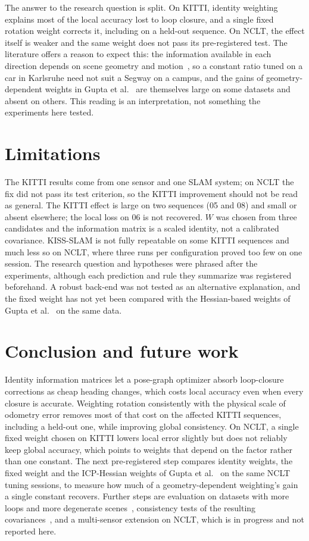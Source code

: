 \documentclass[11pt,a4paper]{article}
\begin{document}
The answer to the research question is split. On KITTI, identity weighting explains most of the local accuracy
lost to loop closure, and a single fixed rotation weight corrects it, including on a held-out sequence. On NCLT,
the effect itself is weaker and the same weight does not pass its pre-registered test. The literature offers a
reason to expect this: the information available in each direction depends on scene geometry and
motion~\cite{degeneracy}, so a constant ratio tuned on a car in Karlsruhe need not suit a Segway on a campus, and
the gains of geometry-dependent weights in Gupta et al.~\cite{retroslam} are themselves large on some datasets
and absent on others. This reading is an interpretation, not something the experiments here tested.

\section{Limitations}
\label{sec:limits}
The KITTI results come from one sensor and one SLAM system; on NCLT the fix did not pass its test criterion, so
the KITTI improvement should not be read as general. The KITTI effect is large on two sequences (05 and 08) and
small or absent elsewhere; the local loss on 06 is not recovered. $W$ was chosen from three candidates and
the information matrix is a scaled identity, not a calibrated covariance. KISS-SLAM is not fully repeatable on
some KITTI sequences and much less so on NCLT, where three runs per configuration proved too few on one session.
The research question and hypotheses were phrased after the experiments, although each prediction and rule they
summarize was registered beforehand. A robust back-end was not tested as an alternative explanation, and the
fixed weight has not yet been compared with the Hessian-based weights of Gupta et al.~\cite{retroslam} on the same
data.

\section{Conclusion and future work}
\label{sec:conclusion}
Identity information matrices let a pose-graph optimizer absorb loop-closure corrections as cheap heading changes,
which costs local accuracy even when every closure is accurate. Weighting rotation consistently with the physical
scale of odometry error removes most of that cost on the affected KITTI sequences, including a held-out one,
while improving global consistency. On NCLT, a single fixed weight chosen on KITTI lowers local error slightly but
does not reliably keep global accuracy, which points to weights that depend on the factor rather than one constant.
The next pre-registered step compares identity weights, the fixed weight and the ICP-Hessian weights of Gupta et
al.~\cite{retroslam} on the same NCLT tuning sessions, to measure how much of a geometry-dependent weighting's
gain a single constant recovers. Further steps are evaluation on datasets with more loops and more degenerate
scenes~\cite{superloc}, consistency tests of the resulting covariances~\cite{ronning2026}, and a multi-sensor
extension on NCLT, which is in progress and not reported here.
\end{document}

